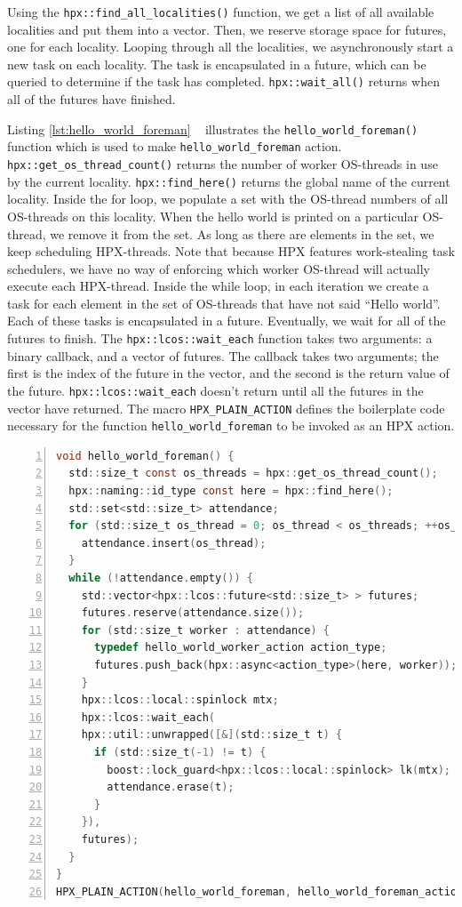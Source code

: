 Using the \verb|hpx::find_all_localities()| function, we get a list of all available localities and put them into a vector. Then, we reserve storage space for futures, one for each locality. Looping through all the localities, we asynchronously start a new task on each locality. The task is encapsulated in a future, which can be queried to determine if the task has completed. \verb|hpx::wait_all()| returns when all of the futures have finished.

Listing \ref{lst:hello_world_foreman} ~\cite{hpx_hello} illustrates the \verb|hello_world_foreman()| function which is used to make \verb|hello_world_foreman| action. \verb|hpx::get_os_thread_count()| returns the number of worker OS-threads in use by the current locality. \verb|hpx::find_here()| returns the global name of the current locality. Inside the for loop, we populate a set with the OS-thread numbers of all OS-threads on this locality. When the hello world is printed on a particular OS-thread, we remove it from the set. As long as there are elements in the set, we keep scheduling HPX-threads. Note that because HPX features work-stealing task schedulers, we have no way of enforcing which worker OS-thread will actually execute each HPX-thread. Inside the while loop, in each iteration we create a task for each element in the set of OS-threads that have not said ``Hello world''. Each of these tasks is encapsulated in a future. Eventually, we wait for all of the futures to finish. The \verb|hpx::lcos::wait_each| function takes two arguments: a binary callback, and a vector of futures. The callback takes two arguments; the first is the index of the future in the vector, and the second is the return value of the future. \verb|hpx::lcos::wait_each| doesn't return until all the futures in the vector have returned. The macro \verb|HPX_PLAIN_ACTION| defines the boilerplate code necessary for the function \verb|hello_world_foreman| to be invoked as an HPX action.

\begin{lstlisting}[language=C, frame=single, numbers=left, basicstyle=\footnotesize, caption=Hello World Foreman\label{lst:hello_world_foreman}]
void hello_world_foreman() {
  std::size_t const os_threads = hpx::get_os_thread_count();
  hpx::naming::id_type const here = hpx::find_here();
  std::set<std::size_t> attendance;
  for (std::size_t os_thread = 0; os_thread < os_threads; ++os_thread) {
    attendance.insert(os_thread);
  }
  while (!attendance.empty()) {
    std::vector<hpx::lcos::future<std::size_t> > futures;
    futures.reserve(attendance.size());
    for (std::size_t worker : attendance) {
      typedef hello_world_worker_action action_type;
      futures.push_back(hpx::async<action_type>(here, worker));
    }
    hpx::lcos::local::spinlock mtx;
    hpx::lcos::wait_each(
    hpx::util::unwrapped([&](std::size_t t) {
      if (std::size_t(-1) != t) {
        boost::lock_guard<hpx::lcos::local::spinlock> lk(mtx);
        attendance.erase(t);
      }
    }),
    futures);
  }
}
HPX_PLAIN_ACTION(hello_world_foreman, hello_world_foreman_action);
\end{lstlisting}


\fi
